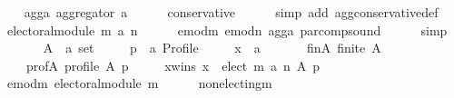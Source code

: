 \begin{isabellebody}
\ \ \isamarkupfalse%
\ agg{\isacharunderscore}{\kern0pt}a{\isacharcolon}{\kern0pt}\ {\isachardoublequoteopen}aggregator\ a{\isachardoublequoteclose}\isanewline
\ \ \ \ \isamarkupfalse%
\ conservative\isanewline
\ \ \ \ \isamarkupfalse%
\ {\isacharparenleft}{\kern0pt}simp\ add{\isacharcolon}{\kern0pt}\ agg{\isacharunderscore}{\kern0pt}conservative{\isacharunderscore}{\kern0pt}def{\isacharparenright}{\kern0pt}\isanewline
\ \ \isamarkupfalse%
\ {\isachardoublequoteopen}electoral{\isacharunderscore}{\kern0pt}module\ {\isacharparenleft}{\kern0pt}m\ {\isasymparallel}\isactrlsub a\ n{\isacharparenright}{\kern0pt}{\isachardoublequoteclose}\isanewline
\ \ \ \ \isamarkupfalse%
\ emod{\isacharunderscore}{\kern0pt}m\ emod{\isacharunderscore}{\kern0pt}n\ agg{\isacharunderscore}{\kern0pt}a\ par{\isacharunderscore}{\kern0pt}comp{\isacharunderscore}{\kern0pt}sound\isanewline
\ \ \ \ \isamarkupfalse%
\ simp\isanewline
{}\isamarkupfalse%
\isanewline
\ \ \isamarkupfalse%
\isanewline
\ \ \ \ A\ {\isacharcolon}{\kern0pt}{\isacharcolon}{\kern0pt}\ {\isachardoublequoteopen}{\isacharprime}{\kern0pt}a\ set{\isachardoublequoteclose}\ \isanewline
\ \ \ \ p\ {\isacharcolon}{\kern0pt}{\isacharcolon}{\kern0pt}\ {\isachardoublequoteopen}{\isacharprime}{\kern0pt}a\ Profile{\isachardoublequoteclose}\ \isanewline
\ \ \ \ x\ {\isacharcolon}{\kern0pt}{\isacharcolon}{\kern0pt}\ {\isachardoublequoteopen}{\isacharprime}{\kern0pt}a{\isachardoublequoteclose}\isanewline
\ \ \isamarkupfalse%
\isanewline
\ \ \ \ fin{\isacharunderscore}{\kern0pt}A{\isacharcolon}{\kern0pt}\ {\isachardoublequoteopen}finite\ A{\isachardoublequoteclose}\ \isanewline
\ \ \ \ prof{\isacharunderscore}{\kern0pt}A{\isacharcolon}{\kern0pt}\ {\isachardoublequoteopen}profile\ A\ p{\isachardoublequoteclose}\ \isanewline
\ \ \ \ x{\isacharunderscore}{\kern0pt}wins{\isacharcolon}{\kern0pt}\ {\isachardoublequoteopen}x\ {\isasymin}\ elect\ {\isacharparenleft}{\kern0pt}m\ {\isasymparallel}\isactrlsub a\ n{\isacharparenright}{\kern0pt}\ A\ p{\isachardoublequoteclose}\isanewline
\ \ \isamarkupfalse%
\ emod{\isacharunderscore}{\kern0pt}m{\isacharcolon}{\kern0pt}\ {\isachardoublequoteopen}electoral{\isacharunderscore}{\kern0pt}module\ m{\isachardoublequoteclose}\isanewline
\ \ \ \ \isamarkupfalse%
\ non{\isacharunderscore}{\kern0pt}electing{\isacharunderscore}{\kern0pt}m\isanewline
\ \ \ \ \isamarkupfalse%

\end{isabellebody}
